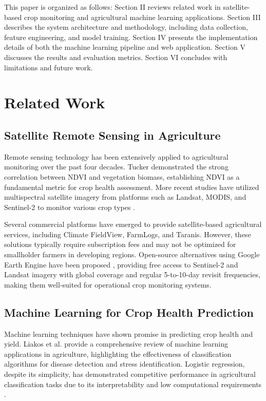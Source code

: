 \documentclass[journal]{IEEEtran}
\begin{document}
This paper is organized as follows: Section II reviews related work in satellite-based crop monitoring and agricultural machine learning applications. Section III describes the system architecture and methodology, including data collection, feature engineering, and model training. Section IV presents the implementation details of both the machine learning pipeline and web application. Section V discusses the results and evaluation metrics. Section VI concludes with limitations and future work.

\section{Related Work}

\subsection{Satellite Remote Sensing in Agriculture}

Remote sensing technology has been extensively applied to agricultural monitoring over the past four decades. Tucker \cite{tucker1979red} demonstrated the strong correlation between NDVI and vegetation biomass, establishing NDVI as a fundamental metric for crop health assessment. More recent studies have utilized multispectral satellite imagery from platforms such as Landsat, MODIS, and Sentinel-2 to monitor various crop types \cite{weiss2020remote}.

Several commercial platforms have emerged to provide satellite-based agricultural services, including Climate FieldView, FarmLogs, and Taranis. However, these solutions typically require subscription fees and may not be optimized for smallholder farmers in developing regions. Open-source alternatives using Google Earth Engine have been proposed \cite{gorelick2017google}, providing free access to Sentinel-2 and Landsat imagery with global coverage and regular 5-to-10-day revisit frequencies, making them well-suited for operational crop monitoring systems.

\subsection{Machine Learning for Crop Health Prediction}

Machine learning techniques have shown promise in predicting crop health and yield. Liakos et al. \cite{liakos2018machine} provide a comprehensive review of machine learning applications in agriculture, highlighting the effectiveness of classification algorithms for disease detection and stress identification. Logistic regression, despite its simplicity, has demonstrated competitive performance in agricultural classification tasks due to its interpretability and low computational requirements \cite{chlingaryan2018machine}.
\end{document}
